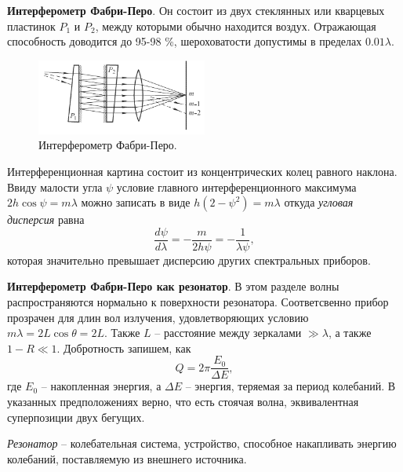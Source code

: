 \textbf{Интерферометр Фабри-Перо}.
Он состоит из двух стеклянных 
или кварцевых пластинок $P_1$ и $P_2$, между которыми обычно находится воздух. Отражающая способность доводится до 95-98 \%, шероховатости допустимы в пределах $0.01 \lambda$. 
\begin{figure}[ht]
    \centering
    \includegraphics[width=0.5\textwidth]{figures/36_2.png}
    \caption{Интерферометр Фабри-Перо.}
    \label{fig:fp}
\end{figure}
Интерференционная картина состоит из концентрических колец равного наклона. Ввиду малости угла $\psi$ условие главного интерференционного максимума $2 h \cos \psi = m \lambda$ можно записать в виде $h(2-\psi^2) = m\lambda$ откуда \textit{угловая дисперсия} равна
\begin{equation*}
    \frac{d \psi}{d \lambda} = - \frac{m}{2 h \psi} = - \frac{1}{\lambda \psi},
\end{equation*}
которая значительно превышает дисперсию других спектральных приборов. 



\textbf{Интерферометр Фабри-Перо как резонатор}.
В этом разделе волны распространяются нормально к поверхности резонатора. Соответсвенно прибор прозрачен для длин вол излучения, удовлетворяющих условию $m \lambda = 2 L \cos \theta = 2 L$. Также $L$ -- расстояние между зеркалами $\gg \lambda$, а также $1-R \ll 1$. Добротность запишем, как
\begin{equation*}
    Q = 2 \pi \frac{E_0}{\Delta E}, 
\end{equation*}
где $E_0$ -- накопленная энергия, а $\Delta E$ -- энергия, теряемая за период колебаний. 
В указанных предположениях верно, что есть стоячая волна, эквивалентная суперпозиции двух бегущих. 



\begin{to_def}
    \textit{Резонатор} -- колебательная система, устройство, способное накапливать энергию колебаний, поставляемую из внешнего источника. 
\end{to_def}


